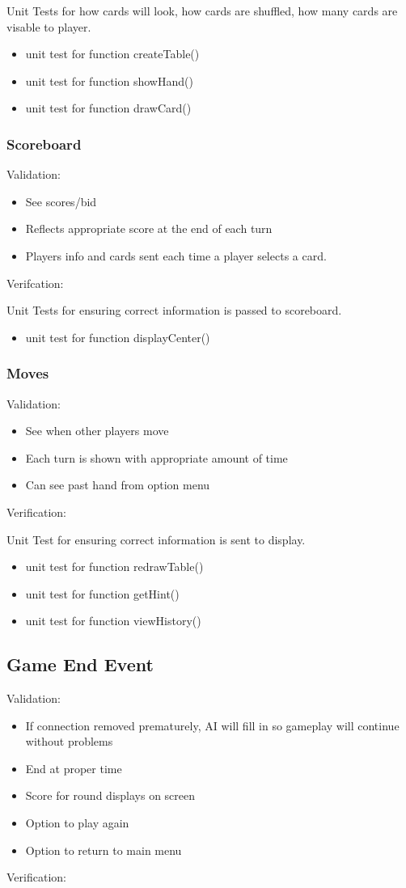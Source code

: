 \documentclass[11pt, titlepage]{article}
\begin{document}
			Unit Tests for how cards will look, how cards are shuffled, how many cards are visable to player.
			\begin{itemize}
				\item unit test for function createTable()		
				\item unit test for function showHand()
				\item unit test for function drawCard()	
			\end{itemize}
			\subsubsection{Scoreboard}
			Validation:
			\begin{itemize}
				\item See scores/bid
				\item Reflects appropriate score at the end of each turn
				\item Players info and cards sent each time a player selects a card.
			\end{itemize}
			Verifcation:
			
			Unit Tests for ensuring correct information is passed to scoreboard.
			\begin{itemize}
				\item unit test for function displayCenter()			
			\end{itemize}
	
			\subsubsection{Moves}
			Validation:
			\begin{itemize}
				\item  See when other players move
				\item  Each turn is shown with appropriate amount of time
				\item  Can see past hand from option menu
			\end{itemize}
			Verification:
		
			Unit Test for ensuring correct information is sent to display.
			\begin{itemize}
				\item unit test for function redrawTable()
				\item unit test for function getHint()
				\item unit test for function viewHistory()			
			\end{itemize}
		\subsection{Game End Event}
			Validation:
			\begin{itemize}
				\item If connection removed prematurely, AI will fill in so gameplay will continue without problems
				\item End at proper time
				\item Score for round displays on screen
				\item Option to play again
				\item Option to return to main menu
			\end{itemize}
			Verification:
			
\end{document}

